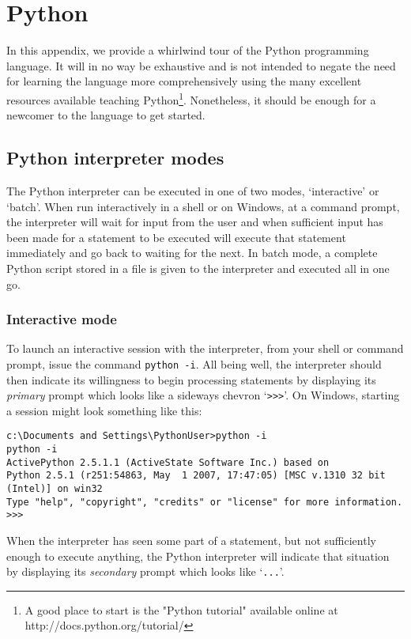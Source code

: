 \chapter {Python} \label{appendix:python-tutorial}

In this appendix, we provide a whirlwind tour of the Python
programming language. It will in no way be exhaustive and is not
intended to negate the need for learning the language more
comprehensively using the many excellent resources available teaching
Python\footnote{A good place to start is the "Python
tutorial" available online at http://docs.python.org/tutorial/}. 
Nonetheless, it should be enough for a newcomer to the language to get
started.

\section{Python interpreter modes}

The Python interpreter can be executed in one of two modes,
`interactive' or `batch'. When run interactively in a shell or on
Windows, at a command prompt, the interpreter will wait for input from
the user and when sufficient input has been made for a statement to be
executed will execute that statement immediately and go back to
waiting for the next. In batch mode, a complete Python script stored
in a file is given to the interpreter and executed all in one go.

\subsection{Interactive mode}

To launch an interactive session with the interpreter, from your shell
or command prompt, issue the command \verb|python -i|. All being well,
the interpreter should then indicate its willingness to begin
processing statements by displaying its \emph{primary} prompt which
looks like a sideways chevron `\verb|>>>|'. On Windows, starting a
session might look something like this:
\begin{verbatim}
c:\Documents and Settings\PythonUser>python -i
python -i
ActivePython 2.5.1.1 (ActiveState Software Inc.) based on
Python 2.5.1 (r251:54863, May  1 2007, 17:47:05) [MSC v.1310 32 bit (Intel)] on win32
Type "help", "copyright", "credits" or "license" for more information.
>>> 
\end{verbatim}
When the interpreter has seen some part of a statement, but not
sufficiently enough to execute anything, the Python interpreter will
indicate that situation by displaying its \emph{secondary} prompt
which looks like `\verb|...|'.


